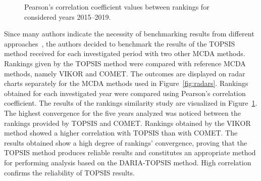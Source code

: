 \documentclass[final,5p,times,twocolumn,authoryear]{elsarticle}
\begin{document}
%
\begin{figure}[ht!]
\centering
\quad
{}
\quad
{}
\caption{Pearson's correlation coefficient values between rankings for considered years 2015--2019.}
\label{fig:correlations}
\end{figure}
%

Since many authors indicate the necessity of benchmarking results from different approaches~\citep{cinelli2020support, cinelli2022recommending}, the authors decided to benchmark the results of the TOPSIS method received for each investigated period with two other MCDA methods. Rankings given by the TOPSIS method were compared with reference MCDA methods, namely VIKOR and COMET. The outcomes are displayed on radar charts separately for the MCDA methods used in Figure~\ref{fig:radars}. Rankings obtained for each investigated year were compared using Pearson's correlation coefficient. The results of the rankings similarity study are visualized in Figure~\ref{fig:correlations}. The highest convergence for the five years analyzed was noticed between the rankings provided by TOPSIS and COMET. Rankings obtained by the VIKOR method showed a higher correlation with TOPSIS than with COMET. The results obtained show a high degree of rankings' convergence, proving that the TOPSIS method produces reliable results and constitutes an appropriate method for performing analysis based on the DARIA-TOPSIS method. High correlation confirms the reliability of TOPSIS results.
\end{document}

